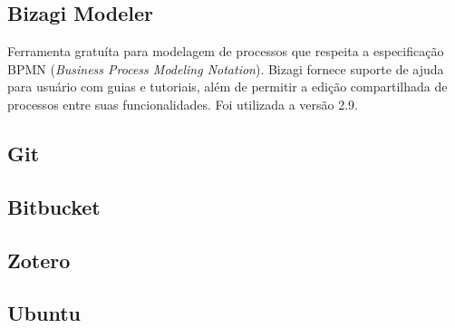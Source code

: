 \subsection{Bizagi Modeler}
Ferramenta gratuíta para modelagem de processos que respeita a especificação BPMN (\textit{Business Process Modeling Notation}). Bizagi fornece suporte de ajuda para usuário com guias e tutoriais, além de permitir a edição compartilhada de processos entre suas funcionalidades. Foi utilizada a versão 2.9.

\subsection{Git}
\subsection{Bitbucket}
\subsection{Zotero}
\subsection{Ubuntu}